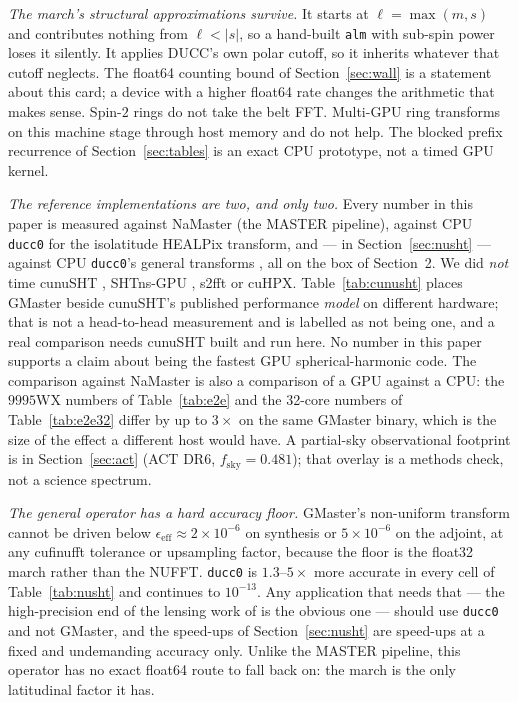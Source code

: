 \documentclass[usenatbib,useAMS]{mnras}
\begin{document}
\textit{The march's structural approximations survive.} It starts at $\ell=\max(m,s)$ and contributes nothing from $\ell<\lvert s\rvert$, so a hand-built \texttt{alm} with sub-spin power loses it silently. It applies DUCC's own polar cutoff, so it inherits whatever that cutoff neglects. The float64 counting bound of Section~\ref{sec:wall} is a statement about this card; a device with a higher float64 rate changes the arithmetic that makes sense. Spin-$2$ rings do not take the belt FFT. Multi-GPU ring transforms on this machine stage through host memory and do not help. The blocked prefix recurrence of Section~\ref{sec:tables} is an exact CPU prototype, not a timed GPU kernel.

\textit{The reference implementations are two, and only two.} Every number in this paper is measured against NaMaster (the MASTER pipeline), against CPU \texttt{ducc0} for the isolatitude HEALPix transform, and --- in Section~\ref{sec:nusht} --- against CPU \texttt{ducc0}'s general transforms \citep{reinecke2023}, all on the box of Section~2. We did \emph{not} time cunuSHT \citep{belkner2024}, SHTns-GPU \citep{schaeffer2013}, s2fft \citep{price2024} or cuHPX. Table~\ref{tab:cunusht} places GMaster beside cunuSHT's published performance \emph{model} on different hardware; that is not a head-to-head measurement and is labelled as not being one, and a real comparison needs cunuSHT built and run here. No number in this paper supports a claim about being the fastest GPU spherical-harmonic code. The comparison against NaMaster is also a comparison of a GPU against a CPU: the $9995$WX numbers of Table~\ref{tab:e2e} and the 32-core numbers of Table~\ref{tab:e2e32} differ by up to $3\times$ on the same GMaster binary, which is the size of the effect a different host would have. A partial-sky observational footprint is in Section~\ref{sec:act} (ACT DR6, $f_{\mathrm{sky}}=0.481$); that overlay is a methods check, not a science spectrum.

\textit{The general operator has a hard accuracy floor.} GMaster's non-uniform transform cannot be driven below $\epsilon_{\mathrm{eff}}\approx2\times10^{-6}$ on synthesis or $5\times10^{-6}$ on the adjoint, at any cufinufft tolerance or upsampling factor, because the floor is the float32 march rather than the NUFFT. \texttt{ducc0} is $1.3$--$5\times$ more accurate in every cell of Table~\ref{tab:nusht} and continues to $10^{-13}$. Any application that needs that --- the high-precision end of the lensing work of \citet{reinecke2023} is the obvious one --- should use \texttt{ducc0} and not GMaster, and the speed-ups of Section~\ref{sec:nusht} are speed-ups at a fixed and undemanding accuracy only. Unlike the MASTER pipeline, this operator has no exact float64 route to fall back on: the march is the only latitudinal factor it has.
\end{document}
